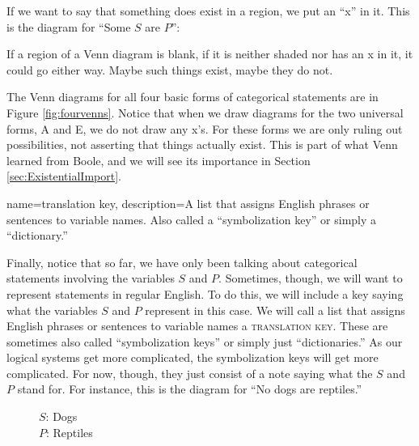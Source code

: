 If we want to say that something does exist in a region, we put an ``x'' in it. This is the diagram for ``Some $S$ are $P$'': 

\begin{center}
\end{center}

If a region of a Venn diagram is blank, if it is neither shaded nor has an x in it, it could go either way. Maybe such things exist, maybe they do not.

The Venn diagrams for all four basic forms of categorical statements are in Figure \ref{fig:fourvenns}. Notice that when we draw diagrams for the two universal forms, A and E, we do not draw any x's. For these forms we are only ruling out possibilities, not asserting that things actually exist. This is part of what Venn learned from Boole, and we will see its importance in Section \ref{sec:ExistentialImport}. 

{
name=translation key,
description={A list that assigns English phrases or sentences to variable names. Also called a ``symbolization key''  or simply a ``dictionary.''}
}

Finally, notice that so far, we have only been talking about categorical statements involving the variables $S$ and $P$. Sometimes, though, we will want to represent statements in regular English. To do this, we will include a key saying what the variables $S$ and $P$ represent in this case. We will call a list that assigns English phrases or sentences to variable names a \textsc{\gls{translation key}}.\label{def:translation_key} These are sometimes also called ``symbolization keys'' or simply just ``dictionaries.'' As our logical systems get more complicated, the symbolization keys will get more complicated. For now, though, they just consist of a note saying what the $S$ and $P$ stand for. For instance, this is the diagram for ``No dogs are reptiles.''

\begin{figure}[H]
\begin{center}
\captionsetup{singlelinecheck=on}
\caption*{$S$: Dogs \\ $P$: Reptiles}
\end{center}
\end{figure}



